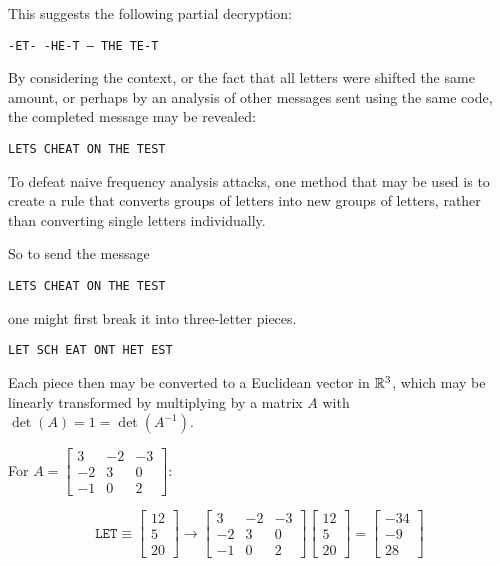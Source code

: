 \begin{applicationActivities}
\begin{observation}
\vspace{1em}

This suggests the following partial decryption:
\begin{center}\texttt{-ET- -HE-T -- THE TE-T}\end{center}

By considering the context, or the fact that all letters
were shifted the same amount, 
or perhaps by an analysis of other messages
sent using the same code, the completed message may be revealed:
\begin{center}\texttt{LETS CHEAT ON THE TEST}\end{center}
\end{observation}

\begin{remark}
To defeat naive frequency analysis attacks, one method that may be
used is to create a rule that converts groups of letters into
new groups of letters, rather than converting single letters
individually.

\vspace{1em}

So to send the message 
\begin{center}\texttt{LETS CHEAT ON THE TEST}\end{center}
one might first break it into three-letter pieces.
\begin{center}\texttt{LET SCH EAT ONT HET EST}\end{center}
\end{remark}

\begin{remark}
Each piece then may be converted to a Euclidean vector in \(\mathbb{R}^3\),
which may be linearly transformed by multiplying by a matrix \(A\)
with \(\det(A)=1=\det(A^{-1})\).

\vspace{1em}

For \(A=\begin{bmatrix}3&-2&-3\\-2&3&0\\-1&0&2\end{bmatrix}\):

\[
\mathtt{LET}\equiv
\begin{bmatrix}12\\5\\20\end{bmatrix}\to
\begin{bmatrix}3&-2&-3\\-2&3&0\\-1&0&2\end{bmatrix}\begin{bmatrix}12\\5\\20\end{bmatrix}=
\begin{bmatrix}-34\\-9\\28\end{bmatrix}
\]
\end{remark}


\end{applicationActivities}
